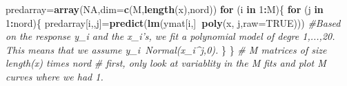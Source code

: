 \documentclass[]{article}
\newenvironment{Shaded}{\begin{snugshade}}{\end{snugshade}}
\newcommand{\KeywordTok}[1]{\textcolor[rgb]{0.13,0.29,0.53}{\textbf{#1}}}
\newcommand{\DataTypeTok}[1]{\textcolor[rgb]{0.13,0.29,0.53}{#1}}
\newcommand{\DecValTok}[1]{\textcolor[rgb]{0.00,0.00,0.81}{#1}}
\newcommand{\CommentTok}[1]{\textcolor[rgb]{0.56,0.35,0.01}{\textit{#1}}}
\newcommand{\OtherTok}[1]{\textcolor[rgb]{0.56,0.35,0.01}{#1}}
\newcommand{\ControlFlowTok}[1]{\textcolor[rgb]{0.13,0.29,0.53}{\textbf{#1}}}
\newcommand{\OperatorTok}[1]{\textcolor[rgb]{0.81,0.36,0.00}{\textbf{#1}}}
\newcommand{\NormalTok}[1]{#1}
\begin{document}
\begin{Shaded}
\begin{Highlighting}[]
\NormalTok{predarray=}\KeywordTok{array}\NormalTok{(}\OtherTok{NA}\NormalTok{,}\DataTypeTok{dim=}\KeywordTok{c}\NormalTok{(M,}\KeywordTok{length}\NormalTok{(x),nord))}
\ControlFlowTok{for}\NormalTok{ (i }\ControlFlowTok{in} \DecValTok{1}\OperatorTok{:}\NormalTok{M)\{}
  \ControlFlowTok{for}\NormalTok{ (j }\ControlFlowTok{in} \DecValTok{1}\OperatorTok{:}\NormalTok{nord)\{}
\NormalTok{    predarray[i,,j]=}\KeywordTok{predict}\NormalTok{(}\KeywordTok{lm}\NormalTok{(ymat[i,]}\OperatorTok{~}\KeywordTok{poly}\NormalTok{(x, j,}\DataTypeTok{raw=}\OtherTok{TRUE}\NormalTok{)))}
    \CommentTok{#Based on the response y_i and the x_i's, we fit a polynomial model of degre 1,...,20. This means that we assume y_i~Normal(x_i^j,0). }
\NormalTok{  \}}
\NormalTok{\}}
\CommentTok{# M matrices of size length(x) times nord}
\CommentTok{# first, only look at variablity in the M fits and plot M curves where we had 1.}


\end{Highlighting}
\end{Shaded}
\end{document}

